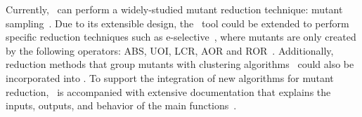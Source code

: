 






Currently, \mr~can perform a widely-studied mutant reduction technique: mutant sampling~\cite{gopinath2015mutation,
jia2011analysis, gopinath2015empirical}.  Due to its extensible design, the \mr~tool could be extended to perform
specific reduction techniques such as e-selective~\cite{offutt1996experimental}, where mutants are only created by the
following operators: ABS, UOI, LCR, AOR and ROR~\cite{gopinath2015empirical}. Additionally, reduction methods that group
mutants with clustering algorithms~\cite{jia2011analysis} could also be incorporated into \mr.  To support the
integration of new algorithms for mutant reduction, \mr~is accompanied with extensive documentation that explains the
inputs, outputs, and behavior of the main functions~\cite{tool}.



